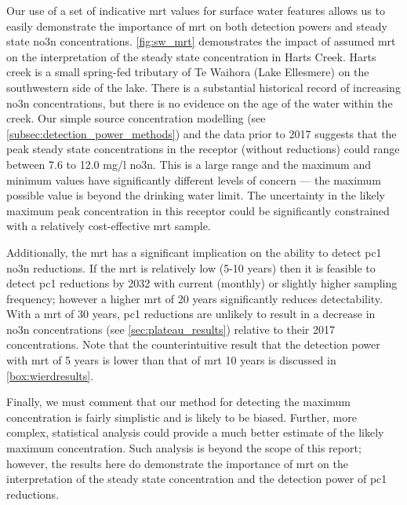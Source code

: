 Our use of a set of indicative \gls{mrt} values for surface water features allows us to easily demonstrate the importance of \gls{mrt} on both detection powers and steady state \gls{no3n} concentrations. \autoref{fig:sw_mrt} demonstrates the impact of assumed \gls{mrt} on the interpretation of the steady state concentration in Harts Creek.  Harts creek is a small spring-fed tributary of Te Waihora (Lake Ellesmere) on the southwestern side of the lake. There is a substantial historical record of increasing \gls{no3n} concentrations, but there is no evidence on the age of the water within the creek. Our simple source concentration modelling (see \autoref{subsec:detection_power_methods}) and the data prior to 2017 suggests that the peak steady state concentrations in the receptor (without reductions) could range between 7.6 to 12.0 mg/l \gls{no3n}.  This is a large range and the maximum and minimum values have significantly different levels of concern --- the maximum possible value is beyond the drinking water limit.  The uncertainty in the likely maximum peak concentration in this receptor could be significantly constrained with a relatively cost-effective \gls{mrt} sample.


Additionally, the \gls{mrt} has a significant implication on the ability to detect \gls{pc1} \gls{no3n} reductions. If the \gls{mrt} is relatively low (5-10 years) then it is feasible to detect \gls{pc1} reductions by 2032 with current (monthly) or slightly higher sampling frequency; however a higher \gls{mrt} of 20 years significantly reduces detectability. With a \gls{mrt} of 30 years, \gls{pc1} reductions are unlikely to result in a decrease in \gls{no3n} concentrations (see \autoref{sec:plateau_results}) relative to their 2017 concentrations. Note that the counterintuitive result that the detection power with \gls{mrt} of 5 years is lower than that of \gls{mrt} 10 years is discussed in \autoref{box:wierdresults}.

Finally, we must comment that our method for detecting the maximum concentration is fairly simplistic and is likely to be biased.  Further, more complex, statistical analysis could provide a much better estimate of the likely maximum concentration. Such analysis is beyond the scope of this report; however, the results here do demonstrate the importance of \gls{mrt} on the interpretation of the steady state concentration and the detection power of \gls{pc1} reductions.

